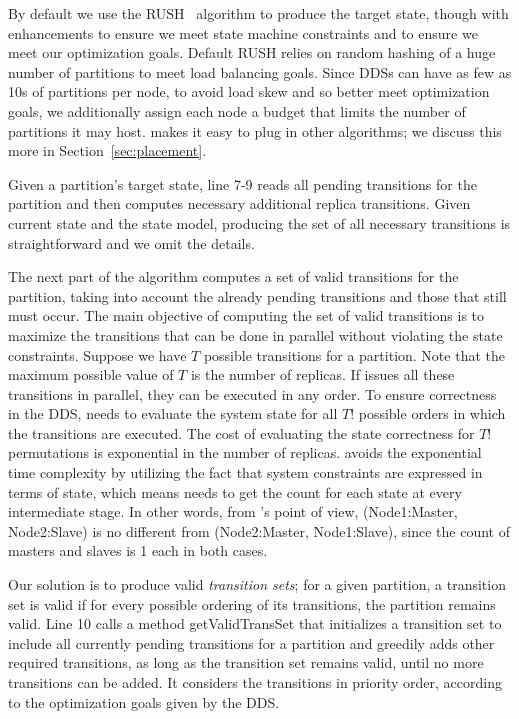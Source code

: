 By default we use the RUSH~\cite{honicky04} algorithm to produce the target state,
though with enhancements to ensure we meet state machine constraints and to
ensure we meet our optimization goals.  Default RUSH relies on
random hashing of a huge number of partitions to meet load balancing goals.
Since DDSs can have as few as 10s of partitions per node, to avoid load skew and
so better meet optimization goals, we
additionally assign each node a budget that limits the number of partitions it
may host.  \helix makes it easy to plug in other algorithms; we
discuss this more in Section~\ref{sec:placement}.

Given a partition's target state, line 7-9 reads all pending transitions for the
partition and then computes necessary additional replica transitions.
Given current state and the state model, producing the set of all necessary
transitions is straightforward
and we omit the details.


The next part of the algorithm computes a set of valid transitions for the
partition, taking into account the already pending transitions and those that
still must occur. The main objective of computing the set of valid transitions is to maximize the 
transitions that can be done in parallel without violating the state constraints. 
Suppose we have $T$ possible transitions for a partition. Note that the maximum
possible value of $T$ is the number of replicas. If \helix issues all these transitions in parallel,
 they can be executed in any order.
To ensure correctness in the DDS, \helix needs to evaluate the system state
for all $T!$ possible orders in which the transitions are executed. The cost of evaluating
the state correctness for $T!$ permutations is exponential in the number of replicas. 
\helix avoids the exponential time complexity by utilizing the fact that
system constraints are expressed in terms of state, which means \helix needs to 
get the count for each state at every intermediate stage.
 In other words, from \helix's point of view, (Node1:Master, Node2:Slave) is no
 different from (Node2:Master, Node1:Slave), since the count of masters and
slaves is 1 each in both cases.

Our solution is to produce valid \emph{transition sets}; for a given
partition, a transition set is valid if
for every possible ordering of its transitions, the partition remains valid.    
Line 10 calls a method getValidTransSet that initializes a
transition set to include all
currently pending transitions for a partition and greedily adds other required
transitions, as long as the transition set remains valid, until no more
transitions can be added.  It considers the transitions in priority order,
according to the optimization goals given by the DDS.

